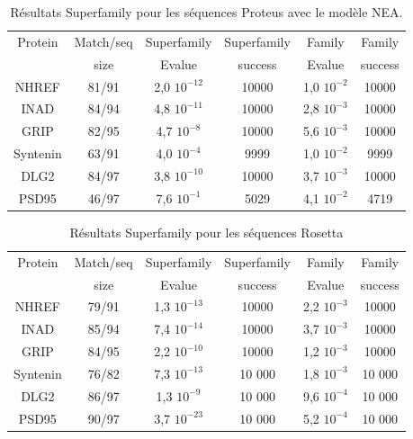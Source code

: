 \begin{table}[h]
       \centering
  \caption{Résultats Superfamily pour les séquences Proteus avec le modèle NEA.}   
  \label{tab:superfamily_model_B6}         
  \begin{tabular}{cccccc}
    
    \toprule
    Protein & Match/seq & Superfamily & Superfamily & Family & Family \\
            & size      & Evalue      & success     & Evalue & success\\
    \cmidrule{1-6}
    NHREF  & 81/91 &     2,0 $10^{-12}$ & 10000  & 1,0 $10^{-2}$ & 10000  \\
    INAD  & 84/94 &      4,8 $10^{-11}$ & 10000  & 2,8 $10^{-3}$ & 10000  \\
    GRIP  & 82/95 &      4,7 $10^{-8}$  & 10000  & 5,6 $10^{-3}$ & 10000  \\
    Syntenin  & 63/91 &  4,0 $10^{-4}$  &  9999  & 1,0 $10^{-2}$ &  9999  \\
    DLG2  & 84/97 &      3,8 $10^{-10}$ & 10000  & 3,7 $10^{-3}$ & 10000  \\
    PSD95  & 46/97 &     7,6 $10^{-1}$  &  5029  & 4,1 $10^{-2}$ &  4719  \\

    \bottomrule        
  \end{tabular}   
\end{table}
\begin{table}[h]
    \caption{Résultats Superfamily pour les séquences Rosetta}   
    \label{tab:superfamily_bestRE}       
    \centering
  \begin{tabular}{cccccc}
    \toprule
    Protein & Match/seq & Superfamily & Superfamily & Family & Family \\
            & size      & Evalue      & success     & Evalue & success\\
    \cmidrule{1-6}
    NHREF    & 79/91   &    1,3 $10^{-13}$ & 10000 & 2,2 $10^{-3}$ & 10000 \\
    INAD     & 85/94   &    7,4 $10^{-14}$ & 10000 & 3,7 $10^{-3}$ & 10000 \\
    GRIP     & 84/95   &    2,2 $10^{-10}$ & 10000 & 1,2 $10^{-3}$ & 10000 \\
    Syntenin & 76/82   &    7,3 $10^{-13}$ & 10 000 & 1,8 $10^{-3}$ & 10 000 \\
    DLG2     & 86/97   &    1,3 $10^{-9}$  & 10 000 & 9,6 $10^{-4}$ & 10 000 \\
    PSD95    & 90/97   &    3,7 $10^{-23}$ & 10 000 & 5,2 $10^{-4}$ & 10 000 \\
    \bottomrule        
  \end{tabular}   
\end{table}

